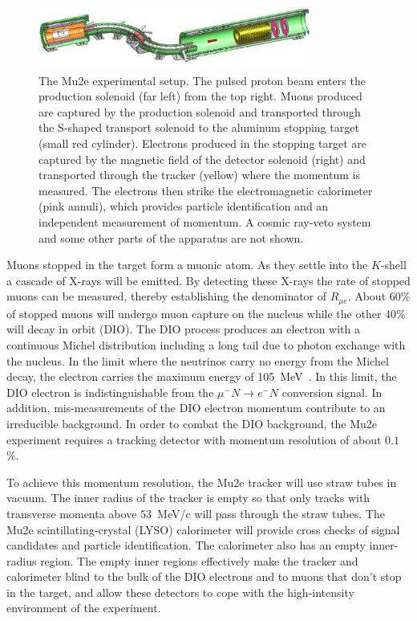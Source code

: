 \begin{figure}
\centering
\includegraphics[width=0.8\textwidth]{ChargedLeptons/Figures/mu2edisk_scaled.pdf}
\caption{The Mu2e experimental setup. The pulsed proton beam enters
the production solenoid (far left) from the top right.  Muons
produced are captured by the production solenoid and transported
through the S-shaped transport solenoid to the aluminum stopping
target (small red cylinder).  Electrons produced in the stopping
target are captured by the magnetic field of the detector solenoid
(right) and transported through the tracker (yellow) where the
momentum is measured.  The electrons then strike the electromagnetic
calorimeter (pink annuli), which provides particle identification and an independent measurement of momentum.
A cosmic ray-veto system and some other parts of the apparatus are not
shown.
}
\label{cl:fig:mu2e}
\end{figure}



Muons stopped in the target form a muonic atom.  As they settle into
the $K$-shell a cascade of X-rays will be emitted.  By detecting these
X-rays the rate of stopped muons can be measured, thereby establishing
the denominator of $R_{\mu e}$. About 60\% of stopped muons will
undergo muon capture on the nucleus while the other 40\% will decay in
orbit (DIO).  The DIO process produces an electron with a continuous
Michel distribution including a long tail due to photon exchange with
the nucleus.  In the limit where the neutrinos carry no energy from
the Michel decay, the electron carries the maximum energy of 105~MeV~\cite{czarnecki}.
In this limit, the DIO electron is indistinguishable from the $\mu^-N
\rightarrow e^-N$ conversion signal.  In addition, mis-measurements of
the DIO electron momentum contribute to an irreducible background.
In order to combat the DIO background, the Mu2e experiment requires a
tracking detector with momentum resolution of about $0.1$\%.


 
To achieve this momentum resolution, the Mu2e tracker will
use straw tubes in vacuum.  The inner radius of the tracker is empty
so that only tracks with transverse momenta above $53$~MeV/c will pass
through the straw tubes. The Mu2e scintillating-crystal (LYSO)
calorimeter will provide cross checks of signal candidates and
particle identification.  The calorimeter also has an empty inner-radius 
region.  The empty inner regions effectively make the tracker
and calorimeter blind to the bulk of the DIO electrons and  to muons that
don't stop in the target, and allow these detectors to cope with the
high-intensity environment of the experiment.


